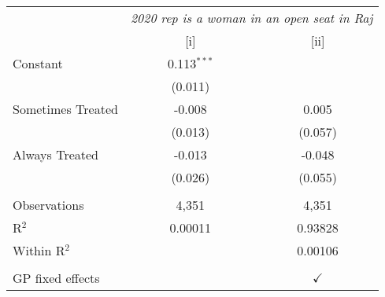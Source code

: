 
\begingroup
\centering
\begin{tabular}{lcc}
   \toprule
    & \multicolumn{2}{c}{\textit{2020 rep is a woman in an open seat in Raj}}\\
                     & [i]           & [ii]\\  
   \midrule 
   Constant          & 0.113$^{***}$ &   \\   
                     & (0.011)       &   \\   
   Sometimes Treated & -0.008        & 0.005\\   
                     & (0.013)       & (0.057)\\   
   Always Treated    & -0.013        & -0.048\\   
                     & (0.026)       & (0.055)\\   
    \\
   Observations      & 4,351         & 4,351\\  
   R$^2$             & 0.00011       & 0.93828\\  
   Within R$^2$      &               & 0.00106\\  
    \\
   GP fixed effects  &               & $\checkmark$\\   
   \bottomrule
\end{tabular}
\par\endgroup


